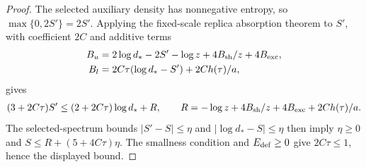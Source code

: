 \begin{proof}\leanok
    The selected auxiliary density has nonnegative entropy, so
    $\max\{0,2S'\}=2S'$. Applying the fixed-scale replica absorption
    theorem to $S'$, with coefficient $2C$ and additive terms
    \begin{align}
        B_u & =2\log d_*-2S'-\log z+4B_{\rm sh}/z+4B_{\rm exc}, \\
        B_l & =2C\tau(\log d_*-S')+2Ch(\tau)/a,
    \end{align}
    gives
    \begin{align}
        (3+2C\tau)S'\le(2+2C\tau)\log d_*+R,\qquad
        R=-\log z+4B_{\rm sh}/z+4B_{\rm exc}+2Ch(\tau)/a.
    \end{align}
    The selected-spectrum bounds
    $|S'-S|\le\eta$ and $|\log d_*-S|\le\eta$
    then imply $\eta\ge0$ and
    $S\le R+(5+4C\tau)\eta$. The smallness condition and
    $E_{\rm def}\ge0$ give $2C\tau\le1$, hence the displayed bound.
\end{proof}
